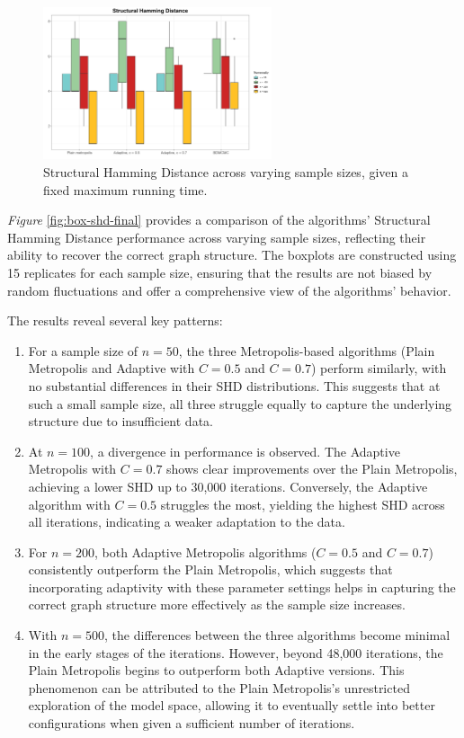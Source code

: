 \documentclass{report}
\begin{document}
\begin{figure}[h] 
	\centering
	\includegraphics[width=0.6\textwidth]{Figures/Overall_comparison/shd_timing.png}
	\caption{Structural Hamming Distance across varying sample sizes, given a fixed maximum running time.}
	\label{fig:box-shd-time}
\end{figure}

\textit{Figure} \ref{fig:box-shd-final} provides a comparison of the algorithms' Structural Hamming Distance performance across varying sample sizes, reflecting their ability to recover the correct graph structure. The boxplots are constructed using 15 replicates for each sample size, ensuring that the results are not biased by random fluctuations and offer a comprehensive view of the algorithms' behavior.

The results reveal several key patterns:

\begin{enumerate}
	\item For a sample size of $n = 50$, the three Metropolis-based algorithms (Plain Metropolis and Adaptive with $C = 0.5$ and $C = 0.7$) perform similarly, with no substantial differences in their SHD distributions. This suggests that at such a small sample size, all three struggle equally to capture the underlying structure due to insufficient data.
	\item At $n = 100$, a divergence in performance is observed. The Adaptive Metropolis with $C = 0.7$ shows clear improvements over the Plain Metropolis, achieving a lower SHD up to 30,000 iterations. Conversely, the Adaptive algorithm with $C = 0.5$ struggles the most, yielding the highest SHD across all iterations, indicating a weaker adaptation to the data.
	\item For $n = 200$, both Adaptive Metropolis algorithms ($C = 0.5$ and $C = 0.7$) consistently outperform the Plain Metropolis, which suggests that incorporating adaptivity with these parameter settings helps in capturing the correct graph structure more effectively as the sample size increases.
	\item With $n = 500$, the differences between the three algorithms become minimal in the early stages of the iterations. However, beyond 48,000 iterations, the Plain Metropolis begins to outperform both Adaptive versions. This phenomenon can be attributed to the Plain Metropolis’s unrestricted exploration of the model space, allowing it to eventually settle into better configurations when given a sufficient number of iterations.
\end{enumerate}
\end{document}
